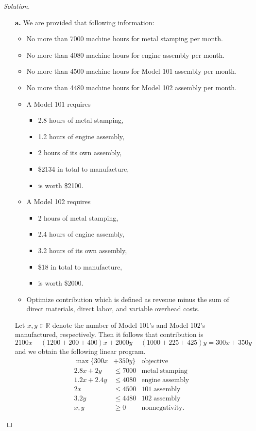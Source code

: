 \documentclass[ 12pt ]{article}
\begin{document}
\begin{enumerate}
		\begin{proof}[Solution] $ $
			\begin{enumerate}
				\item[\textbf{a.}] We are provided that following information:
					\begin{itemize}
						\item No more than 7000 machine hours for metal stamping per month.
						\item No more than 4080 machine hours for engine assembly per month.
						\item No more than 4500 machine hours for Model 101 assembly per month.
						\item No more than 4480 machine hours for Model 102 assembly per month.
						\item A Model 101 requires
						\begin{itemize}
							\item 2.8 hours of metal stamping,
							\item 1.2 hours of engine assembly,
							\item 2 hours of its own assembly,
							\item \$2134 in total to manufacture,
							\item is worth \$2100.
						\end{itemize}
						\item A Model 102 requires
						\begin{itemize}
							\item 2 hours of metal stamping,
							\item 2.4 hours of engine assembly,
							\item 3.2 hours of its own assembly,
							\item \$18 in total to manufacture,
							\item is worth \$2000.
						\end{itemize}
						\item Optimize contribution which is defined as revenue minus the sum of direct materials, direct labor, and variable overhead costs.
					\end{itemize}
					Let $x, y \in \mathbb{R}$ denote the number of Model 101's and Model 102's manufactured, respectively. Then it follows that contribution is
					$$2100x - (1200 + 200 + 400)x + 2000y - (1000 + 225 + 425)y = 300x + 350y$$
					and we obtain the following linear program.
					\begin{align*}
						\max \{ 300x &+ 350y \}  &\mathrm{objective} \\
						2.8x + 2y &\leq 7000 &\mathrm{metal\; stamping} \\
						1.2x + 2.4y &\leq 4080 &\mathrm{engine\; assembly} \\
						2x &\leq 4500 &\mathrm{101\; assembly} \\
						3.2y &\leq 4480 &\mathrm{102\; assembly} \\
						x, y &\geq 0 &\mathrm{nonnegativity}.
					\end{align*}


\end{enumerate}
\end{proof}
\end{enumerate}
\end{document}
